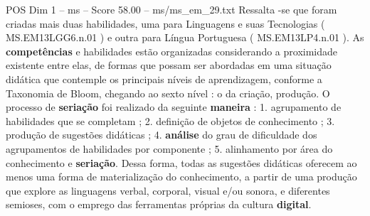 \begin{textsample}{POS Dim 1 – ms – Score 58.00 – ms/ms\_em\_29.txt}
Ressalta -se que foram criadas mais duas habilidades, uma para Linguagens e suas Tecnologias ( MS.EM13LGG6.n.01 ) e outra para Língua Portuguesa ( MS.EM13LP4.n.01 ).
As \textbf{competências} e habilidades estão organizadas considerando a proximidade existente entre elas, de formas que possam ser abordadas em uma situação didática que contemple os principais níveis de aprendizagem, conforme a Taxonomia de Bloom, chegando ao sexto nível : o da criação, produção.
O processo de \textbf{seriação} foi realizado da seguinte \textbf{maneira} : 1. agrupamento de habilidades que se completam ; 2. definição de objetos de conhecimento ; 3. produção de sugestões didáticas ; 4. \textbf{análise} do grau de dificuldade dos agrupamentos de habilidades por componente ; 5. alinhamento por área do conhecimento e \textbf{seriação}.
Dessa forma, todas as sugestões didáticas oferecem ao menos uma forma de materialização do conhecimento, a partir de uma produção que explore as linguagens verbal, corporal, visual e/ou sonora, e diferentes semioses, com o emprego das ferramentas próprias da cultura \textbf{digital}.

\end{textsample}
